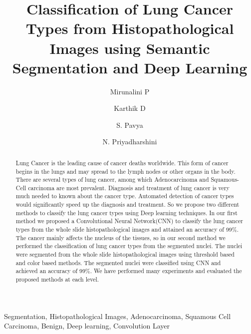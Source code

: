 \documentclass{comjnl}
\begin{document}
\author{Mirunalini P}

\author{Karthik D}

\author{S. Pavya}

\author{N. Priyadharshini}

\title{Classification of Lung Cancer Types from Histopathological Images using Semantic Segmentation and Deep Learning}

\maketitle

\begin{abstract}
Lung Cancer is the leading cause of cancer deaths worldwide. This form of cancer begins in the lungs and may spread to the lymph nodes or other organs in the body. There are several types of lung cancer, among which Adenocarcinoma and Squamous-Cell carcinoma are most prevalent. Diagnosis and treatment of lung cancer is very much needed to known about the cancer type. Automated detection of cancer types would significantly speed up the diagnosis and treatment. So we propose two different methods to classify the lung cancer types using Deep learning techniques. In our first method we proposed a Convolutional Neural Network(CNN) to classify the lung cancer types from the whole slide histopathological images and attained an accuracy of 99\%. The cancer mainly affects the nucleus of the tissues, so in our second method we performed the classification of lung cancer types from the segmented nuclei. The nuclei were segmented from the whole slide histopathological images using threshold based and color based methods. The segmented nuclei were classified using CNN and achieved an accuracy of 99\%. We have performed many experiments and evaluated the proposed methods at each level.
\end{abstract}

\begin{keywords}
Segmentation, Histopathological Images, Adenocarcinoma, Squamous Cell Carcinoma, Benign, Deep learning, Convolution Layer
\end{keywords}
\end{document}
